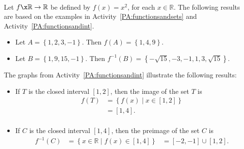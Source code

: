 \begin{example}\label{exam:imageandinverse} \hfill \\
Let $f\x  \mathbb{R} \to \mathbb{R}$ be defined by $f( x ) = x^2$, for each 
$x \in \mathbb{R}$.  The following results are based on the examples in 
\typeu Activity~\ref*{PA:functionsandsets} and \typeu Activity~\ref*{PA:functionsandint}.

\begin{itemize}
\item Let $A = \left\{ 1, 2, 3, -1 \right\}$.  Then
$f ( A ) = \left\{ 1, 4, 9 \right\}$.

\item Let $B = \left\{ 1, 9, 15, -1 \right\}$.  Then 
$f^{-1} ( B ) = \left\{ -\sqrt{15}, -3, -1, 1, 3, \sqrt{15} \right\}$.
\end{itemize}

%
\noindent
The graphs from \typeu Activity~\ref*{PA:functionsandint} illustrate the following results:
\begin{itemize}
\item If $T$ is the closed interval $\left[ 1, 2 \right]$, then the image of the set $T$ is
\[
\begin{aligned}
f ( T ) &= \left\{ f ( x ) \mid x \in \left[ 1, 2 \right] \right\} \\
                   &= \left[ 1, 4 \right]. \\
\end{aligned}
\]

\item If $C$ is the closed interval $\left[ 1, 4 \right]$, then the preimage of the set 
$C$ is
\[
\begin{aligned}
f^{-1} ( C ) &= \left\{ x \in \mathbb{R} \mid f ( x ) \in \left[ 1, 4 \right] \right\}
                        &= \left[ -2, -1 \right] \cup \left[ 1, 2 \right].
\end{aligned}
\]
\end{itemize}
\end{example}
\hbreak


\endinput
